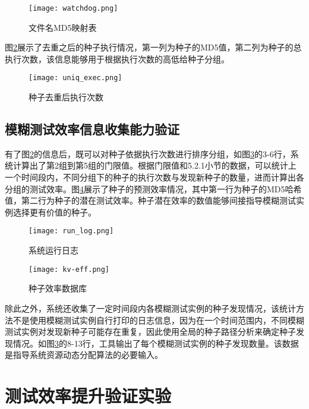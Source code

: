 \documentclass[master]{thesis-uestc}
\begin{document}
\begin{figure}[!htbp]
    \vspace{6pt}
    \centering
    \texttt{[image: watchdog.png]}
    \caption{文件名MD5映射表}
    \label{watch_dog}
\end{figure}

图\ref{uniq_exec}展示了去重之后的种子执行情况，第一列为种子的MD5值，第二列为种子的总执行次数，该信息能够用于根据执行次数的高低给种子分组。

\begin{figure}[!htbp]
    \vspace{6pt}
    \centering
    \texttt{[image: uniq\_exec.png]}
    \caption{种子去重后执行次数}
    \label{uniq_exec}
\end{figure}

\subsection{模糊测试效率信息收集能力验证}

有了图\ref{uniq_exec}的信息后，既可以对种子依据执行次数进行排序分组，如图\ref{run_log}的3-6行，系统计算出了第2组到第5组的门限值。根据门限值和5.2.1小节的数据，可以统计上一个时间段内，不同分组下的种子的执行次数与发现新种子的数量，进而计算出各分组的测试效率。图\ref{kv}展示了种子的预测效率情况，其中第一行为种子的MD5哈希值，第二行为种子的潜在测试效率。种子潜在效率的数值能够间接指导模糊测试实例选择更有价值的种子。

\begin{figure}[!htbp]
    \vspace{6pt}
    \centering
    \texttt{[image: run\_log.png]}
    \caption{系统运行日志}
    \label{run_log}
\end{figure}

\begin{figure}[!htbp]
    \vspace{6pt}
    \centering
    \texttt{[image: kv-eff.png]}
    \caption{种子效率数据库}
    \label{kv}
\end{figure}

除此之外，系统还收集了一定时间段内各模糊测试实例的种子发现情况，该统计方法不是使用模糊测试实例自行打印的日志信息，因为在一个时间范围内，不同模糊测试实例对发现新种子可能存在重复，因此使用全局的种子路径分析来确定种子发现情况。如图\ref{run_log}的8-13行，工具输出了每个模糊测试实例的种子发现数量。该数据是指导系统资源动态分配算法的必要输入。



\section{测试效率提升验证实验}
\end{document}
